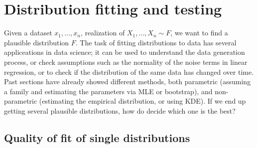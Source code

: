 \section{Distribution fitting and testing}

Given a dataset $x_1, \ldots, x_n$, realization of $X_1, \ldots, X_n \sim F$, we want to find a plausible distribution $F$. The task of fitting distributions to data has several appliceations in data science; it can be used to understand the data generation process, or check assumptions such as the normality of the noise terms in linear regression, or to check if the distribution of the same data has changed over time. Past sections have already showed different methods, both parametric (assuming a family and estimating the parameters via MLE or bootstrap), and non-parametric (estimating the empirical distribution, or using KDE). If we end up getting several plausible distributions, how do decide which one is the best?

\subsection{Quality of fit of single distributions}

